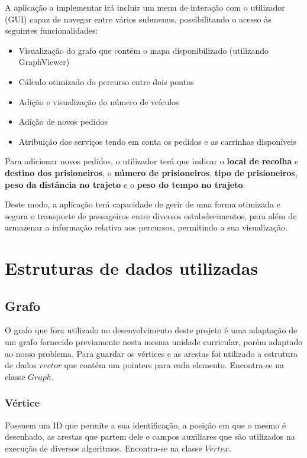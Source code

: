 \documentclass[article, a4paper, 12pt, oneside]{memoir}
\begin{document}
A aplicação a implementar irá incluir um menu de interação com o utilizador (GUI) capaz de navegar entre vários submenus, possibilitando o acesso às seguintes funcionalidades:

\begin{itemize}
	\item Visualização do grafo que contém o mapa disponibilizado (utilizando GraphViewer)
	\item Cálculo otimizado do percurso entre dois pontos
	\item Adição e visualização do número de veículos
	\item Adição de novos pedidos
	\item Atribuição dos serviços tendo em conta os pedidos e as carrinhas disponíveis
\end{itemize}

Para adicionar novos pedidos, o utilizador terá que indicar o \textbf{local de recolha} e \textbf{destino dos prisioneiros}, o \textbf{número de prisioneiros}, \textbf{tipo de prisioneiros}, \textbf{peso da distância no trajeto} e o \textbf{peso do tempo no trajeto}.

Deste modo, a aplicação terá capacidade de gerir de uma forma otimizada e segura o transporte de passageiros entre diversos estabelecimentos, para além de armazenar a informação relativa aos percursos, permitindo a sua visualização.

\newpage
\chapter[Estruturas de dados utilizadas][Estruturas de dados utilizadas]{Estruturas de dados utilizadas} \label{\thechapter}

\section{Grafo}
O grafo que fora utilizado no desenvolvimento deste projeto é uma adaptação de um grafo fornecido previamente nesta mesma unidade curricular, porém adaptado ao nosso problema. Para guardar os vértices e as 
arestas foi utilizado a estrutura de dados $vector$ que contém um pointers para cada elemento. Encontra-se na classe $Graph$.

\subsection{Vértice}
Possuem um ID que permite a sua identificação, a posição em que o mesmo é desenhado, as arestas que partem dele e campos auxiliares que são utilizados
na execução de diversos algoritmos. Encontra-se na classe $Vertex$.
\end{document}
